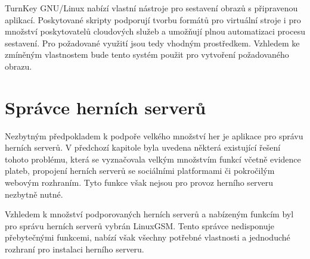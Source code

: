 TurnKey GNU/Linux nabízí vlastní nástroje pro sestavení obrazů s připravenou aplikací. Poskytované skripty podporují tvorbu formátů
pro virtuální stroje i pro množství poskytovatelů cloudových služeb a umožňují plnou automatizaci procesu sestavení.
Pro požadované využití jsou tedy vhodným prostředkem. Vzhledem ke zmíněným vlastnostem bude tento systém použit pro vytvoření
požadovaného obrazu.

\section{Správce herních serverů}

Nezbytným předpokladem k podpoře velkého množství her je aplikace pro správu herních serverů. V předchozí kapitole
byla uvedena některá existující řešení tohoto problému, která se vyznačovala velkým množstvím funkcí včetně
evidence plateb, propojení herních serverů se sociálními platformami či pokročilým webovým rozhraním.
Tyto funkce však nejsou pro provoz herního serveru nezbytně nutné.

Vzhledem k množství podporovaných herních serverů a nabízeným funkcím byl pro správu herních serverů vybrán LinuxGSM.
Tento správce nedisponuje přebytečnými funkcemi, nabízí však všechny potřebné vlastnosti a jednoduché rozhraní pro instalaci
herního serveru.
